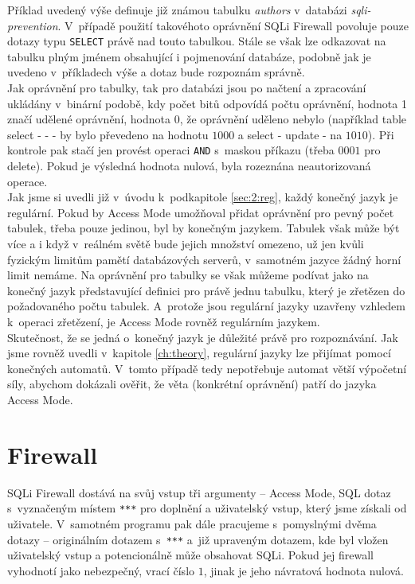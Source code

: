 Příklad uvedený výše definuje již známou tabulku \textit{authors} v~databázi \textit{sqli-prevention}. V~případě použití takovéhoto oprávnění SQLi 
Firewall povoluje pouze dotazy typu \texttt{SELECT} právě nad touto tabulkou. Stále se však lze odkazovat na tabulku plným jménem obsahující i 
pojmenování databáze, podobně jak je uvedeno v~příkladech výše a dotaz bude rozpoznám správně. \\

Jak oprávnění pro tabulky, tak pro databázi jsou po načtení a zpracování ukládány v~binární podobě, kdy počet bitů odpovídá počtu
oprávnění, hodnota 1 značí udělené oprávnění, hodnota 0, že oprávnění uděleno nebylo (například table select -{} -{} - by bylo převedeno
na hodnotu $1000$ a select - update - na $1010$). Při kontrole pak stačí jen provést operaci \texttt{AND} s~maskou příkazu (třeba
$0001$ pro delete). Pokud je výsledná hodnota nulová, byla rozeznána neautorizovaná operace. \\

Jak jsme si uvedli již v~úvodu k~podkapitole \ref{sec:2:reg}, každý konečný jazyk je regulární. Pokud by Access Mode umožňoval přidat oprávnění 
pro pevný počet tabulek, třeba pouze jedinou, byl by konečným jazykem. Tabulek však může být více a i když v~reálném světě bude jejich množství 
omezeno, už jen kvůli fyzickým limitům pamětí databázových serverů, v~samotném jazyce žádný horní limit nemáme. Na oprávnění pro tabulky se však 
můžeme podívat jako na konečný jazyk představující definici pro právě jednu tabulku, který je zřetězen do požadovaného počtu tabulek.
A~protože jsou regulární jazyky uzavřeny vzhledem k~operaci zřetězení, je Access Mode rovněž regulárním jazykem. \\

Skutečnost, že se jedná o~konečný jazyk je důležité právě pro rozpoznávání. Jak jsme rovněž uvedli v~kapitole \ref{ch:theory}, regulární jazyky lze 
přijímat pomocí konečných automatů. V~tomto případě tedy nepotřebuje automat větší výpočetní síly, abychom dokázali ověřit, že 
věta (konkrétní oprávnění) patří do jazyka Access Mode.

\section{Firewall} \label{sec:6:firewall}
SQLi Firewall dostává na svůj vstup tři argumenty -- Access Mode, SQL dotaz s~vyznačeným místem \texttt{***} pro doplnění a uživatelský vstup, který
jsme získali od uživatele. V~samotném programu pak dále pracujeme s~pomyslnými dvěma dotazy -- originálním dotazem s~\texttt{***} a~již 
upraveným dotazem, kde byl vložen uživatelský vstup a potencionálně může obsahovat SQLi. Pokud jej firewall vyhodnotí jako nebezpečný,
vrací číslo $1$, jinak je jeho návratová hodnota nulová. \\

